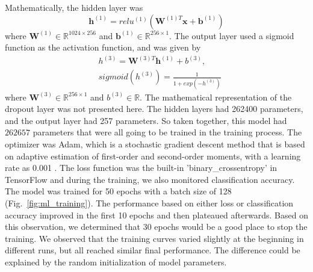 \documentclass{article}
\begin{document}
Mathematically, the hidden layer was
$$\bm{h}^{(1)} = relu^{(1)}(\bm{W}^{(1)T}\bm{x} + \bm{b}^{(1)})$$
where $\bm{W}^{(1)} \in \mathbb{R}^{1024\times 256}$ and $\bm{b}^{(1)} \in \mathbb{R}^{256\times 1}$.
The output layer used a sigmoid function as the activation function, and was given by 
\begin{align*}
    &{h}^{(3)} = \bm{W}^{(3)T}\bm{h}^{(1)} + {b}^{(3)},  \\
    &sigmoid(h^{(3)}) = \frac{1}{1 + exp(-h^{(3)})}
\end{align*}
where $\bm{W}^{(3)} \in \mathbb{R}^{256\times 1}$ and ${b}^{(3)} \in \mathbb{R}$.
The mathematical representation of the dropout layer was not presented here. 
The hidden layers had 262400 parameters, and the output layer had 257 parameters. 
So taken together, this model had $262657$ parameters that were all going to be trained in the training process. 
The optimizer was Adam, which is a stochastic gradient descent method that is based on adaptive estimation of first-order and second-order moments, with a learning rate as 0.001 \citep{kingma2014adam}.
The loss function was the built-in 'binary\_crossentropy' in TensorFlow and during the training, we also monitored classification accuracy. 
The model was trained for 50 epochs with a batch size of 128 (Fig.~\ref{fig:ml_training}). 
The performance based on either loss or classification accuracy improved in the first 10 epochs and then plateaued afterwards. 
Based on this observation, we determined that 30 epochs would be a good place to stop the training.
We observed that the training curves varied slightly at the beginning in different runs, but all reached similar final performance. The difference could be explained by the random initialization of model parameters.
\end{document}
